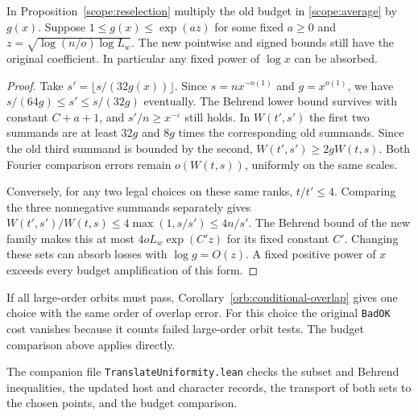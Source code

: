 \begin{corollary}\label{scope:reselection-loss}
In Proposition~\ref{scope:reselection} multiply the old budget
in \eqref{scope:average} by \(g(x)\).
Suppose \(1\le g(x)\le \exp(a z)\) for some fixed \(a\ge0\)
and \(z=\sqrt{\log(n/o)\log L_w}\). The new pointwise and signed bounds
still have the original coefficient. In particular any fixed power
of \(\log x\) can be absorbed.
\end{corollary}
\begin{proof}
Take \(s'=\lfloor s/(32g(x))\rfloor\). Since \(s=n x^{-o(1)}\) and
\(g=x^{o(1)}\), we have \(s/(64g)\le s'\le s/(32g)\) eventually.
The Behrend lower bound survives with constant \(C+a+1\), and
\(s'/n\ge x^{-\varepsilon}\) still holds. In \(W(t',s')\) the first
two summands are at least \(32g\) and \(8g\) times the corresponding
old summands. Since the old third summand is bounded by the second,
\(W(t',s')\ge2gW(t,s)\). Both Fourier comparison errors remain
\(o(W(t,s))\), uniformly on the same scales.

Conversely, for any two legal choices on these same ranks,
\(t/t'\le4\). Comparing the three nonnegative summands separately
gives \(W(t',s')/W(t,s)\le4\max(1,s/s')\le4n/s'\).
The Behrend bound of the new family makes this at most
\(4oL_w\exp(C' z)\) for its fixed constant \(C'\).
Changing these sets can absorb losses with \(\log g=O(z)\).
A fixed positive power of \(x\) exceeds every budget amplification
of this form.
\end{proof}

If all large-order orbits must pass, Corollary~\ref{orb:conditional-overlap}
gives one choice with the same order of overlap error. For this choice
the original \texttt{BadOK} cost vanishes because it counts failed
large-order orbit tests. The budget comparison above applies directly.

The companion file \texttt{TranslateUniformity.lean} checks the subset
and Behrend inequalities, the updated host and character records, the
transport of both sets to the chosen points, and the budget comparison.
